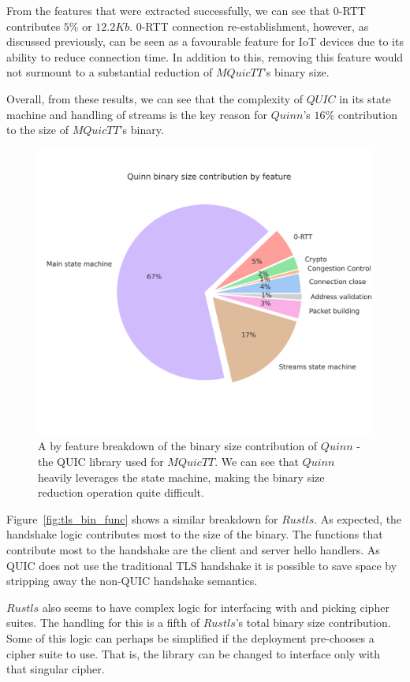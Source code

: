From the features that were extracted successfully, we can see that 0-RTT contributes $5\%$ or $12.2Kb$.
0-RTT connection re-establishment, however, as discussed previously, can be seen as a favourable feature for IoT devices due to its ability to reduce connection time.
In addition to this, removing this feature would not surmount to a substantial reduction of $MQuicTT$'s binary size.

Overall, from these results, we can see that the complexity of $QUIC$ in its state machine and handling of streams is the key reason for $Quinn$'s $16\%$ contribution to the size of $MQuicTT$'s binary.

\begin{figure}[ht]
    \centering
    \includegraphics[width=0.75\linewidth]{images/mquictt_binary_by_function.png}
    \caption{A by feature breakdown of the binary size contribution of $Quinn$ - the QUIC library used for $MQuicTT$. We can see that $Quinn$ heavily leverages the state machine, making the binary size reduction operation quite difficult.}
    \label{fig:mquictt_bin_func}
\end{figure}

Figure~\ref{fig:tls_bin_func} shows a similar breakdown for $Rustls$.
As expected, the handshake logic contributes most to the size of the binary.
The functions that contribute most to the handshake are the client and server hello handlers.
As QUIC does not use the traditional TLS handshake it is possible to save space by stripping away the non-QUIC handshake semantics.

$Rustls$ also seems to have complex logic for interfacing with and picking cipher suites.
The handling for this is a fifth of $Rustls$'s total binary size contribution.
Some of this logic can perhaps be simplified if the deployment pre-chooses a cipher suite to use.
That is, the library can be changed to interface only with that singular cipher.

